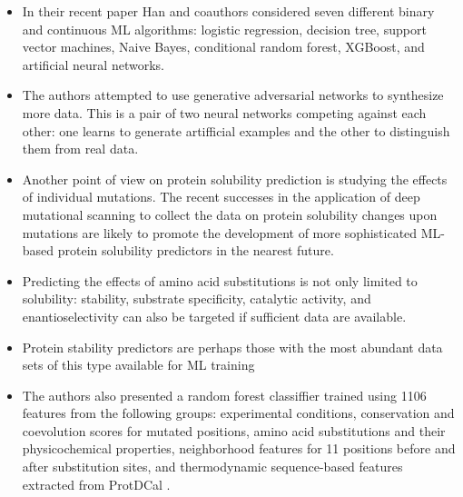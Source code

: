 \documentclass[12pt]{article}
\newtheorem{Note}{Nota}%
\begin{document}
\begin{itemize}
\begin{Note}
Data from the label-free mass spectroscopy-based assay of 91 substrates and 54 enzymes derived from the plant Arabidopsis thaliana were used for functional prediction. The authors trained sequence-based decision trees, systematically varying combinations of physicochemical  properties,  e.g. log P, molecular area, and number/type of nuclephilic groups, and structural information, e.g.  scaffold type and functional groups. The resulting predictor was successfully tested on four individually selected gene sequences as well as two complete families of enzymes from four different organisms, which highlights the tremendous potential of training ML predictors on the newly acquired data from high-throughput data collection methods. 
\end{Note}

\item In their recent paper \cite{35} Han and coauthors considered seven different binary and continuous ML algorithms: logistic regression, decision tree, support vector machines,  Naive Bayes,  conditional random forest,  XGBoost, and artificial neural networks. 

\item The authors attempted to use generative adversarial networks to synthesize more data. This is a pair of two neural networks competing against each other: one learns to generate artifficial examples and the other to distinguish them from real data. 

\item Another point of view on protein solubility prediction is studying the effects of individual mutations. The recent successes in the application of deep mutational scanning to collect the data on protein solubility changes upon mutations\cite{68} are likely to promote the development of more sophisticated ML-based protein solubility predictors in the nearest future. 

\item Predicting the effects of amino acid substitutions is not only limited to solubility: stability, substrate specificity, catalytic activity, and enantioselectivity can also be targeted if sufficient data are available.


\item Protein stability predictors are perhaps those with the most abundant data sets of this type available for ML training

\item The authors also presented a random forest classiffier trained using 1106 features from the following groups: experimental conditions, conservation and coevolution scores for mutated positions, amino acid substitutions and their physicochemical properties, neighborhood features for 11 positions before and after substitution sites, and thermodynamic sequence-based features extracted from ProtDCal \cite{69}. 



\end{itemize}
\end{document}

